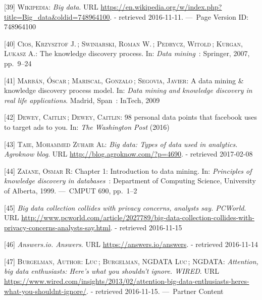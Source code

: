 \documentclass[12pt,english,a4paper,titlepage,cleardoublepage=empty,dottedtoc]{report}
\begin{document}
\hypertarget{ref-web_2016_wikipedia_definition_big-data}{}
{[}39{]} \textsc{Wikipedia}: \emph{Big data}. URL
\url{https://en.wikipedia.org/w/index.php?title=Big_data\&oldid=748964100}.
- retrieved 2016-11-11. ---~Page Version ID: 748964100

\hypertarget{ref-chapter_2007_the-knowledge-discovery-process}{}
{[}40{]} \textsc{Cios, Krzysztof J.}\,; \textsc{Swiniarski, Roman W.}\,;
\textsc{Pedrycz, Witold}\,; \textsc{Kurgan, Lukasz A.}: The knowledge
discovery process. In: \emph{Data mining}~: Springer, 2007, pp.~9--24

\hypertarget{ref-paper_2009_a-data-mining-knowledge-discovery-process-model}{}
{[}41{]} \textsc{Marbán, Óscar}\,; \textsc{Mariscal, Gonzalo}\,;
\textsc{Segovia, Javier}: A data mining \& knowledge discovery process
model. In: \emph{Data mining and knowledge discovery in real life
applications}. Madrid, Span~: InTech, 2009

\hypertarget{ref-web_2016_facebook-utilizes-98-data-points}{}
{[}42{]} \textsc{Dewey, Caitlin}\,; \textsc{Dewey, Caitlin}: 98 personal
data points that facebook uses to target ads to you. In: \emph{The
Washington Post} (2016)

\hypertarget{ref-web_2016_big-data-types-of-data-used-in-analytics}{}
{[}43{]} \textsc{Taie, Mohammed Zuhair Al}: \emph{Big data: Types of
data used in analytics. Agroknow blog}. URL
\url{http://blog.agroknow.com/?p=4690}. - retrieved 2017-02-08

\hypertarget{ref-book-chapter_1999_Principles-of-knowledge-discovery-in-databases_introduction-to-data-mining}{}
{[}44{]} \textsc{Zaïane, Osmar R}: Chapter 1: Introduction to data
mining. In: \emph{Principles of knowledge discovery in databases}~:
Department of Computing Science, University of Alberta, 1999. ---~CMPUT
690, pp.~1--2

\hypertarget{ref-web_2013_big-data-collection-collides-with-privacy-concerns}{}
{[}45{]} \emph{Big data collection collides with privacy concerns,
analysts say. PCWorld}. URL
\url{http://www.pcworld.com/article/2027789/big-data-collection-collides-with-privacy-concerns-analysts-say.html}.
- retrieved 2016-11-15

\hypertarget{ref-web_2016_answers-io}{}
{[}46{]} \emph{Answers.io. Answers}. URL
\url{https://answers.io/answers}. - retrieved 2016-11-14

\hypertarget{ref-web_2016_big-data-enthusiasts-should-not-ignore}{}
{[}47{]} \textsc{Burgelman, Author: Luc}\,; \textsc{Burgelman, NGDATA
Luc}\,; \textsc{NGDATA}: \emph{Attention, big data enthusiasts: Here's
what you shouldn't ignore. WIRED}. URL
\url{https://www.wired.com/insights/2013/02/attention-big-data-enthusiasts-heres-what-you-shouldnt-ignore/}.
- retrieved 2016-11-15. ---~Partner Content
\end{document}
